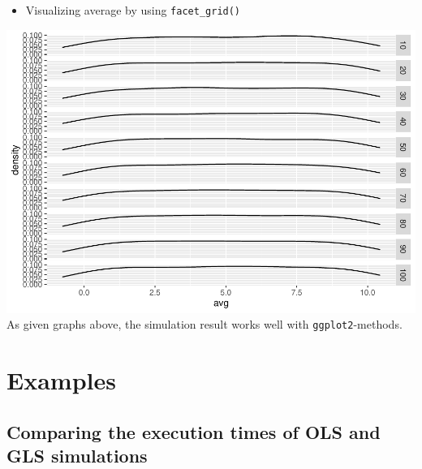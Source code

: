 \documentclass[11pt,a4paper]{article}
\newenvironment{Shaded}{\begin{snugshade}}{\end{snugshade}}
\newcommand{\AttributeTok}[1]{\textcolor[rgb]{0.77,0.63,0.00}{#1}}
\newcommand{\FunctionTok}[1]{\textcolor[rgb]{0.00,0.00,0.00}{#1}}
\newcommand{\NormalTok}[1]{#1}
\newcommand{\SpecialCharTok}[1]{\textcolor[rgb]{0.00,0.00,0.00}{#1}}
\begin{document}
\begin{itemize}
  
\item
  Visualizing average by using \texttt{facet\_grid()}
\end{itemize}

\begin{Shaded}
\end{Shaded}

\includegraphics{Abschlussarbeit_01_Sep_files/figure-latex/facet-1.pdf}
As given graphs above, the simulation result works well with
\texttt{ggplot2}-methods.

\pagebreak

\hypertarget{examples}{%
\section{Examples}\label{examples}}

\hypertarget{comparing-the-execution-times-of-ols-and-gls-simulations}{%
\subsection{Comparing the execution times of OLS and GLS
simulations}\label{comparing-the-execution-times-of-ols-and-gls-simulations}}
\end{document}
